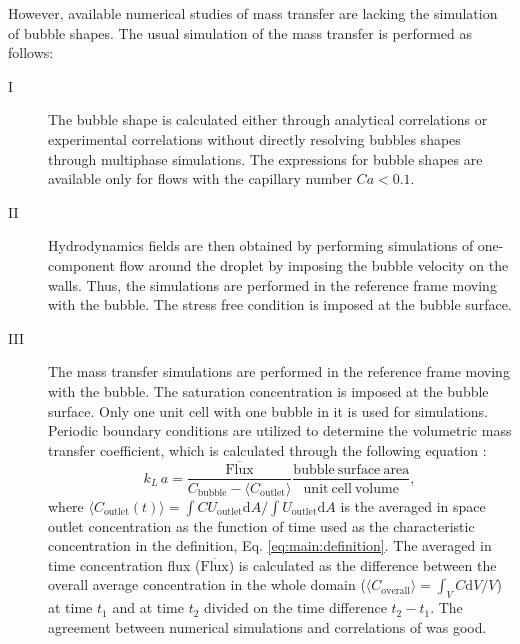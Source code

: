 \documentclass{article}
\newcommand{\vol}{k_L\,a}
\newcommand{\uoutlet}{U_{\mathrm{outlet}}}
\newcommand{\cbubble}{C_{\mathrm{bubble}}}
\newcommand{\coutlet}{C_{\mathrm{outlet}}}
\newcommand{\coverall}{C_{\mathrm{overall}}}
\begin{document}
However, available numerical studies of mass transfer \cite{kreutzer-overview,vanbaten-circular} are lacking the simulation of  bubble shapes. The usual simulation of the mass transfer  is performed as follows: 
\begin{description}
\item[I] The bubble shape is calculated either through analytical correlations \cite{bretherton} or experimental correlations \cite{cerro-bubble-train} without directly resolving bubbles shapes through multiphase simulations.  The expressions for bubble shapes are available only for flows with the capillary number $Ca<0.1$.
\item[II] Hydrodynamics fields are then obtained by performing simulations of one-component flow around the droplet by imposing the bubble velocity on the walls. Thus, the simulations are performed in the reference frame moving with the bubble. The stress free condition is imposed at the bubble surface. 
\item[III]  The mass transfer simulations are  performed in the reference frame moving with the bubble. The saturation concentration is imposed at the bubble surface. Only one unit cell with one bubble in it is used for simulations. Periodic boundary conditions are utilized to determine the volumetric mass transfer coefficient, which is calculated through the following equation \cite{vanbaten-circular}:
\begin{equation}
\label{main:simulation:equation}
\vol=\frac{\mathrm{\overline{Flux}}}{\cbubble-\langle\coutlet\rangle} \frac{\mathrm{bubble\ surface\ area}}{\mathrm{unit\
cell\ volume}},
\end{equation}
where $\langle\coutlet(t)\rangle=\int{C \uoutlet \mathrm{d}A}/\int{\uoutlet\mathrm{d}A}$ is the averaged in space outlet concentration as the function of time used as the characteristic concentration in the definition, Eq. \ref{eq:main:definition}. 
The averaged in time concentration flux ($\mathrm{\overline{Flux}}$) is calculated as the difference between the overall
average concentration in the whole domain ($\langle\coverall\rangle=\int_{V} C \mathrm{d}V /V$)
at time
$t_1$ and at time $t_2$ divided on the time difference $t_2-t_1$. The agreement between numerical
simulations \cite{vanbaten-circular} and correlations of \citet{bercic-mass} was good. 
\end{description}
\end{document}

